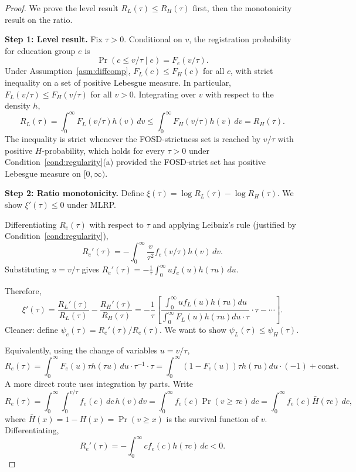 \begin{proof}
We prove the level result $R_L(\tau) \leq R_H(\tau)$ first, then the monotonicity result on the ratio.

\textbf{Step 1: Level result.} Fix $\tau > 0$. Conditional on $v$, the registration probability for education group $e$ is
\[
\Pr(c \leq v/\tau \mid e) = F_e(v/\tau).
\]
Under Assumption~\ref{asm:diffcomp}, $F_L(c) \leq F_H(c)$ for all $c$, with strict inequality on a set of positive Lebesgue measure. In particular, $F_L(v/\tau) \leq F_H(v/\tau)$ for all $v > 0$. Integrating over $v$ with respect to the density $h$,
\[
R_L(\tau) = \int_0^\infty F_L(v/\tau) h(v) \, dv \leq \int_0^\infty F_H(v/\tau) h(v) \, dv = R_H(\tau).
\]
The inequality is strict whenever the FOSD-strictness set is reached by $v/\tau$ with positive $H$-probability, which holds for every $\tau > 0$ under Condition~\ref{cond:regularity}(a) provided the FOSD-strict set has positive Lebesgue measure on $[0, \infty)$.

\textbf{Step 2: Ratio monotonicity.} Define $\xi(\tau) = \log R_L(\tau) - \log R_H(\tau)$. We show $\xi'(\tau) \leq 0$ under MLRP.

Differentiating $R_e(\tau)$ with respect to $\tau$ and applying Leibniz's rule (justified by Condition~\ref{cond:regularity}),
\begin{equation}
R_e'(\tau) = -\int_0^\infty \frac{v}{\tau^2} f_e(v/\tau) h(v) \, dv.
\label{eq:Re_deriv}
\end{equation}
Substituting $u = v/\tau$ gives $R_e'(\tau) = -\frac{1}{\tau} \int_0^\infty u f_e(u) h(\tau u) \, du$.

Therefore,
\[
\xi'(\tau) = \frac{R_L'(\tau)}{R_L(\tau)} - \frac{R_H'(\tau)}{R_H(\tau)} = -\frac{1}{\tau} \left[ \frac{\int_0^\infty u f_L(u) h(\tau u) du}{\int_0^\infty F_L(u) h(\tau u) du \cdot \tau} \cdot \tau - \cdots\right].
\]
Cleaner: define $\psi_e(\tau) = R_e'(\tau)/R_e(\tau)$. We want to show $\psi_L(\tau) \leq \psi_H(\tau)$.

Equivalently, using the change of variables $u = v/\tau$,
\[
R_e(\tau) = \int_0^\infty F_e(u) \tau h(\tau u)\, du \cdot \tau^{-1} \cdot \tau = \int_0^\infty (1 - F_e(u)) \tau h(\tau u) du \cdot (-1) + \text{const.}
\]
A more direct route uses integration by parts. Write
\[
R_e(\tau) = \int_0^\infty \int_0^{v/\tau} f_e(c) \, dc \, h(v) dv = \int_0^\infty f_e(c) \Pr(v \geq \tau c) \, dc = \int_0^\infty f_e(c) \bar H(\tau c) \, dc,
\]
where $\bar H(x) = 1 - H(x) = \Pr(v \geq x)$ is the survival function of $v$. Differentiating,
\[
R_e'(\tau) = -\int_0^\infty c f_e(c) h(\tau c) \, dc < 0.
\]


\end{proof}
